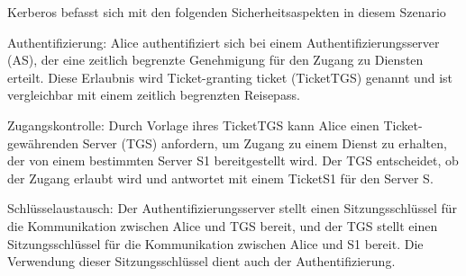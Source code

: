 \documentclass[a4paper]{article}
\begin{document}
\begin{multicols}{3}
\begin{itemize*}
            \item Kerberos befasst sich mit den folgenden Sicherheitsaspekten in diesem Szenario
            \begin{itemize*}
                  \item Authentifizierung: Alice authentifiziert sich bei einem Authentifizierungsserver (AS), der eine zeitlich begrenzte Genehmigung für den Zugang zu Diensten erteilt. Diese Erlaubnis wird Ticket-granting ticket (TicketTGS) genannt und ist vergleichbar mit einem zeitlich begrenzten Reisepass.
                  \item Zugangskontrolle: Durch Vorlage ihres TicketTGS kann Alice einen Ticket-gewährenden Server (TGS) anfordern, um Zugang zu einem Dienst zu erhalten, der von einem bestimmten Server S1 bereitgestellt wird. Der TGS entscheidet, ob der Zugang erlaubt wird und antwortet mit einem TicketS1 für den Server S.
                  \item Schlüsselaustausch: Der Authentifizierungsserver stellt einen Sitzungsschlüssel für die Kommunikation zwischen Alice und TGS bereit, und der TGS stellt einen Sitzungsschlüssel für die Kommunikation zwischen Alice und S1 bereit. Die Verwendung dieser Sitzungsschlüssel dient auch der Authentifizierung.
            \end{itemize*}
      \end{itemize*}


\end{multicols}
\end{document}
